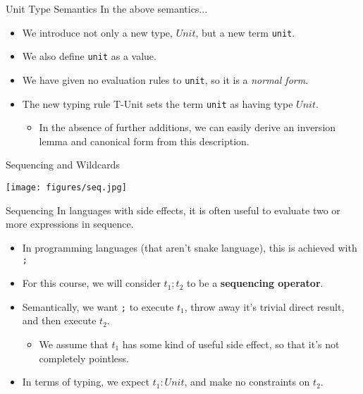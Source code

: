 \documentclass[11pt]{beamer}
\begin{document}
\begin{frame}[fragile=singleslide]{Unit Type Semantics}
In the above semantics...
\begin{itemize}
\item We introduce not only a new type, $Unit$, but a new term \texttt{unit}.
\item We also define \texttt{unit} as a value.
\item We have given no evaluation rules to \texttt{unit}, so it is a \emph{normal form}.
\item The new typing rule T-Unit sets the term \texttt{unit} as having type $Unit$.  
\begin{itemize}
\item In the absence of further additions, we can easily derive an inversion lemma and canonical form from this description.  
\end{itemize}
\end{itemize}
\end{frame}

\begin{frame}[fragile=singleslide]{Sequencing and Wildcards}
\begin{center}
\texttt{[image: figures/seq.jpg]}
\end{center}
\end{frame}

\begin{frame}[fragile=singleslide]{Sequencing}
In languages with side effects, it is often useful to evaluate two or more expressions in sequence.
\begin{itemize}
\item In programming languages (that aren't snake language), this is achieved with \texttt{;} 
\item For this course, we will consider $t_1 ; t_2$ to be a  \textbf{sequencing operator}.
\item Semantically, we want \texttt{;} to execute $t_1$, throw away it's trivial direct result, and then execute $t_2$.
\begin{itemize}
\item We assume that $t_1$ has some kind of useful side effect, so that it's not completely pointless. 
\end{itemize}
\item In terms of typing, we expect $t_1 : Unit$, and make no constraints on $t_2$.
\end{itemize}
\end{frame}
\end{document}
